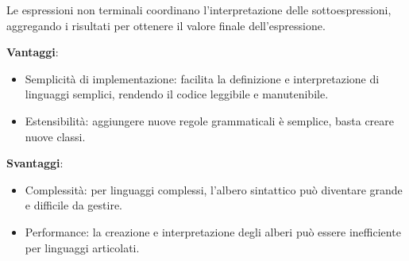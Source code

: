 Le espressioni non terminali coordinano l'interpretazione delle sottoespressioni, aggregando i risultati per ottenere il valore finale dell'espressione.

\textbf{Vantaggi}:
\begin{itemize}
    \item Semplicità di implementazione: facilita la definizione e interpretazione di linguaggi semplici, rendendo il codice leggibile e manutenibile.
    \item Estensibilità: aggiungere nuove regole grammaticali è semplice, basta creare nuove classi.
\end{itemize}

\textbf{Svantaggi}:
\begin{itemize}
    \item Complessità: per linguaggi complessi, l'albero sintattico può diventare grande e difficile da gestire.
    \item Performance: la creazione e interpretazione degli alberi può essere inefficiente per linguaggi articolati.
\end{itemize}

\newpage
